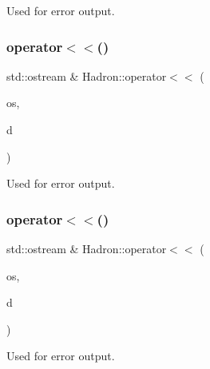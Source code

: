 Used for error output. 

\mbox{\label{namespaceHadron_a04ae91286afb27f277e2c61cd6a77b8a}} 
\subsubsection{\texorpdfstring{operator$<$$<$()}{operator<<()}\hspace{0.1cm}{\footnotesize\ttfamily [25/48]}}
{\footnotesize\ttfamily std\+::ostream \& Hadron\+::operator$<$$<$ (\begin{DoxyParamCaption}\item[{std\+::ostream \&}]{os,  }\item[{const \mbox{\hyperlink{structHadron_1_1KeyGlueElementalOperator__t}{Key\+Glue\+Elemental\+Operator\+\_\+t}} \&}]{d }\end{DoxyParamCaption})}



Used for error output. 

\mbox{\label{namespaceHadron_a7065bb8b0e72a1c7d300230e08cdfdde}} 
\subsubsection{\texorpdfstring{operator$<$$<$()}{operator<<()}\hspace{0.1cm}{\footnotesize\ttfamily [26/48]}}
{\footnotesize\ttfamily std\+::ostream \& Hadron\+::operator$<$$<$ (\begin{DoxyParamCaption}\item[{std\+::ostream \&}]{os,  }\item[{const \mbox{\hyperlink{structHadron_1_1KeyTetraQuarkElementalOperator__t}{Key\+Tetra\+Quark\+Elemental\+Operator\+\_\+t}} \&}]{d }\end{DoxyParamCaption})}



Used for error output. 

\mbox{\label{namespaceHadron_a3dd51258353773598e3f2a8a3252816f}} 
